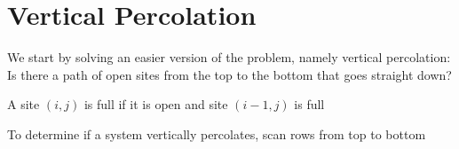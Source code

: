 \documentclass[8pt,a4paper,compress]{beamer}
\begin{document}
\section{Vertical Percolation}
\begin{frame}[fragile]
\pause

We start by solving an easier version of the problem, namely vertical percolation: Is there a path of open sites from the top to the bottom that goes straight down?

\begin{center}
\end{center}

\pause
\bigskip

A site $(i, j)$ is full if it is open and site $(i-1, j)$ is full

\pause
\bigskip

To determine if a system vertically percolates, scan rows from top to bottom

\begin{center}
\end{center}
\end{frame}
\end{document}
